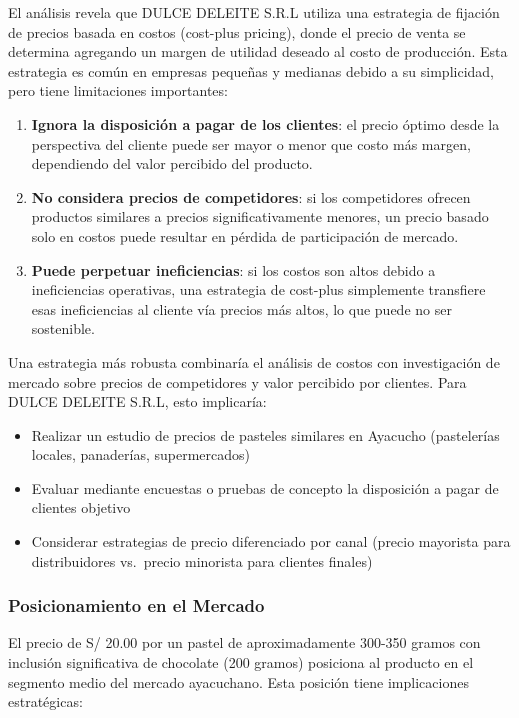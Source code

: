 \documentclass[
  stu,
  floatsintext,
  longtable,
  a4paper,
  nolmodern,
  notxfonts,
  notimes,
  12pt,
  colorlinks=true,linkcolor=blue,citecolor=blue,urlcolor=blue]{apa7}
\providecommand{\tightlist}{%
  \setlength{\itemsep}{0pt}\setlength{\parskip}{0pt}}
\begin{document}
El análisis revela que DULCE DELEITE S.R.L utiliza una estrategia de
fijación de precios basada en costos (cost-plus pricing), donde el
precio de venta se determina agregando un margen de utilidad deseado al
costo de producción. Esta estrategia es común en empresas pequeñas y
medianas debido a su simplicidad, pero tiene limitaciones importantes:

\begin{enumerate}
\def\labelenumi{\arabic{enumi}.}
\item
  \textbf{Ignora la disposición a pagar de los clientes}: el precio
  óptimo desde la perspectiva del cliente puede ser mayor o menor que
  costo más margen, dependiendo del valor percibido del producto.
\item
  \textbf{No considera precios de competidores}: si los competidores
  ofrecen productos similares a precios significativamente menores, un
  precio basado solo en costos puede resultar en pérdida de
  participación de mercado.
\item
  \textbf{Puede perpetuar ineficiencias}: si los costos son altos debido
  a ineficiencias operativas, una estrategia de cost-plus simplemente
  transfiere esas ineficiencias al cliente vía precios más altos, lo que
  puede no ser sostenible.
\end{enumerate}

Una estrategia más robusta combinaría el análisis de costos con
investigación de mercado sobre precios de competidores y valor percibido
por clientes. Para DULCE DELEITE S.R.L, esto implicaría:

\begin{itemize}
\tightlist
\item
  Realizar un estudio de precios de pasteles similares en Ayacucho
  (pastelerías locales, panaderías, supermercados)
\item
  Evaluar mediante encuestas o pruebas de concepto la disposición a
  pagar de clientes objetivo
\item
  Considerar estrategias de precio diferenciado por canal (precio
  mayorista para distribuidores vs.~precio minorista para clientes
  finales)
\end{itemize}

\subsubsection{Posicionamiento en el
Mercado}\label{posicionamiento-en-el-mercado}

El precio de S/ 20.00 por un pastel de aproximadamente 300-350 gramos
con inclusión significativa de chocolate (200 gramos) posiciona al
producto en el segmento medio del mercado ayacuchano. Esta posición
tiene implicaciones estratégicas:
\end{document}
